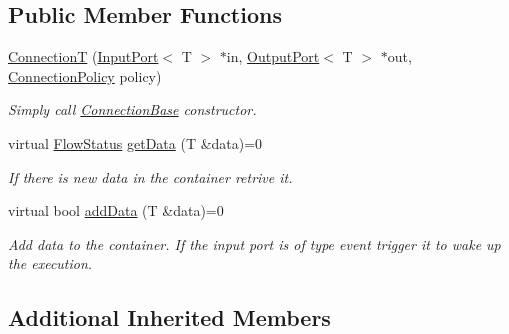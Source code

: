 \subsection*{Public Member Functions}
\begin{DoxyCompactItemize}
\item 
\hypertarget{classcoco_1_1_connection_t_a036f8c67d029ce417a331df695d49515}{\hyperlink{classcoco_1_1_connection_t_a036f8c67d029ce417a331df695d49515}{Connection\-T} (\hyperlink{classcoco_1_1_input_port}{Input\-Port}$<$ T $>$ $\ast$in, \hyperlink{classcoco_1_1_output_port}{Output\-Port}$<$ T $>$ $\ast$out, \hyperlink{structcoco_1_1_connection_policy}{Connection\-Policy} policy)}\label{classcoco_1_1_connection_t_a036f8c67d029ce417a331df695d49515}

\begin{DoxyCompactList}\small\item\em Simply call \hyperlink{classcoco_1_1_connection_base}{Connection\-Base} constructor. \end{DoxyCompactList}\item 
\hypertarget{classcoco_1_1_connection_t_aed88cfa8b0384f879b09561096b35a56}{virtual \hyperlink{namespacecoco_a057be58377e415c9be98c1dc5c8426ad}{Flow\-Status} \hyperlink{classcoco_1_1_connection_t_aed88cfa8b0384f879b09561096b35a56}{get\-Data} (T \&data)=0}\label{classcoco_1_1_connection_t_aed88cfa8b0384f879b09561096b35a56}

\begin{DoxyCompactList}\small\item\em If there is new data in the container retrive it. \end{DoxyCompactList}\item 
\hypertarget{classcoco_1_1_connection_t_addca57488f686446a10e0f37bfa8c1ea}{virtual bool \hyperlink{classcoco_1_1_connection_t_addca57488f686446a10e0f37bfa8c1ea}{add\-Data} (T \&data)=0}\label{classcoco_1_1_connection_t_addca57488f686446a10e0f37bfa8c1ea}

\begin{DoxyCompactList}\small\item\em Add data to the container. If the input port is of type event trigger it to wake up the execution. \end{DoxyCompactList}\end{DoxyCompactItemize}
\subsection*{Additional Inherited Members}


